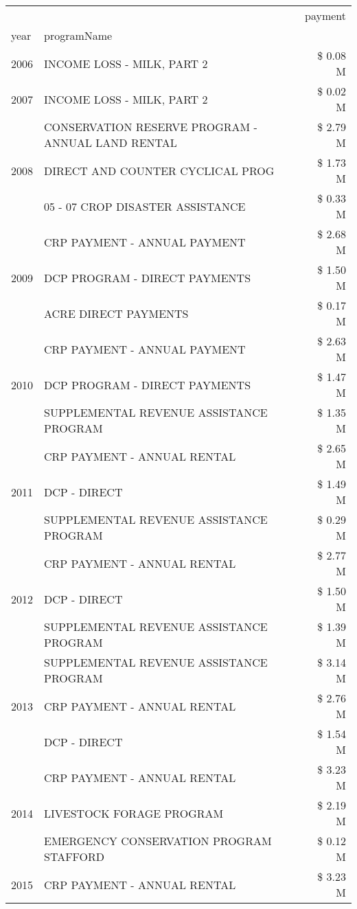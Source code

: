 \begin{tabular}{llr}
\toprule
 &  & payment \\
year & programName &  \\
\midrule
2006 & INCOME LOSS - MILK, PART 2 & \$ 0.08 M \\
\cline{1-3}
2007 & INCOME LOSS - MILK, PART 2 & \$ 0.02 M \\
\cline{1-3}
\multirow[t]{3}{*}{2008} & CONSERVATION RESERVE PROGRAM - ANNUAL LAND RENTAL & \$ 2.79 M \\
 & DIRECT AND COUNTER CYCLICAL PROG & \$ 1.73 M \\
 & 05 - 07 CROP DISASTER ASSISTANCE & \$ 0.33 M \\
\cline{1-3}
\multirow[t]{3}{*}{2009} & CRP PAYMENT - ANNUAL PAYMENT & \$ 2.68 M \\
 & DCP PROGRAM - DIRECT PAYMENTS & \$ 1.50 M \\
 & ACRE DIRECT PAYMENTS & \$ 0.17 M \\
\cline{1-3}
\multirow[t]{3}{*}{2010} & CRP PAYMENT - ANNUAL PAYMENT & \$ 2.63 M \\
 & DCP PROGRAM - DIRECT PAYMENTS & \$ 1.47 M \\
 & SUPPLEMENTAL REVENUE ASSISTANCE PROGRAM & \$ 1.35 M \\
\cline{1-3}
\multirow[t]{3}{*}{2011} & CRP PAYMENT - ANNUAL RENTAL & \$ 2.65 M \\
 & DCP - DIRECT & \$ 1.49 M \\
 & SUPPLEMENTAL REVENUE ASSISTANCE PROGRAM & \$ 0.29 M \\
\cline{1-3}
\multirow[t]{3}{*}{2012} & CRP PAYMENT - ANNUAL RENTAL & \$ 2.77 M \\
 & DCP - DIRECT & \$ 1.50 M \\
 & SUPPLEMENTAL REVENUE ASSISTANCE PROGRAM & \$ 1.39 M \\
\cline{1-3}
\multirow[t]{3}{*}{2013} & SUPPLEMENTAL REVENUE ASSISTANCE PROGRAM & \$ 3.14 M \\
 & CRP PAYMENT - ANNUAL RENTAL & \$ 2.76 M \\
 & DCP - DIRECT & \$ 1.54 M \\
\cline{1-3}
\multirow[t]{3}{*}{2014} & CRP PAYMENT - ANNUAL RENTAL & \$ 3.23 M \\
 & LIVESTOCK FORAGE PROGRAM & \$ 2.19 M \\
 & EMERGENCY CONSERVATION PROGRAM STAFFORD & \$ 0.12 M \\
\cline{1-3}
\multirow[t]{3}{*}{2015} & CRP PAYMENT - ANNUAL RENTAL & \$ 3.23 M \\

\end{tabular}
